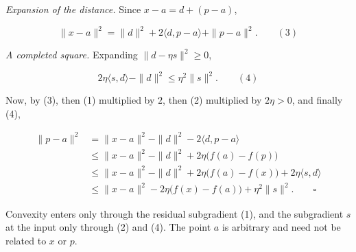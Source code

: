 \documentclass[11pt,a4paper]{report}
\begin{document}
\emph{Expansion of the distance.} Since \(x-a=d+(p-a)\),


\[\|x-a\|^2=\|d\|^2+2\langle d,p-a\rangle+\|p-a\|^2.\qquad(3)\]


\emph{A completed square.} Expanding \(\|d-\eta s\|^2\ge0\),


\[2\eta\langle s,d\rangle-\|d\|^2\le\eta^2\|s\|^2.\qquad(4)\]


Now, by (3), then (1) multiplied by \(2\), then (2) multiplied by \(2\eta>0\), and finally (4),


\[\begin{aligned}
\|p-a\|^2&=\|x-a\|^2-\|d\|^2-2\langle d,p-a\rangle\\
&\le\|x-a\|^2-\|d\|^2+2\eta\bigl(f(a)-f(p)\bigr)\\
&\le\|x-a\|^2-\|d\|^2+2\eta\bigl(f(a)-f(x)\bigr)+2\eta\langle s,d\rangle\\
&\le\|x-a\|^2-2\eta\bigl(f(x)-f(a)\bigr)+\eta^2\|s\|^2. \qquad\square
\end{aligned}\]


Convexity enters only through the residual subgradient (1), and the subgradient \(s\) at the input only through (2) and (4). The point \(a\) is arbitrary and need not be related to \(x\) or \(p\).
\end{document}
